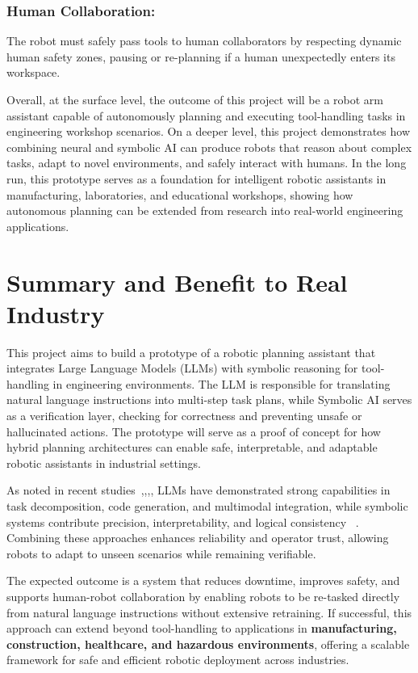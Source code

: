 \documentclass[12pt]{extarticle}
\begin{document}
\subsubsection{Human Collaboration:} The robot must safely pass tools to human collaborators by respecting dynamic human safety zones, pausing or re-planning if a human unexpectedly enters its workspace.

Overall, at the surface level, the outcome of this project will be a robot arm assistant capable of autonomously planning and executing tool-handling tasks in engineering workshop scenarios. On a deeper level, this project demonstrates how combining neural and symbolic AI can produce robots that reason about complex tasks, adapt to novel environments, and safely interact with humans. In the long run, this prototype serves as a foundation for intelligent robotic assistants in manufacturing, laboratories, and educational workshops, showing how autonomous planning can be extended from research into real-world engineering applications.

\newpage
\section{Summary and Benefit to Real Industry}

This project aims to build a prototype of a robotic planning assistant that integrates Large Language Models (LLMs) with symbolic reasoning for tool-handling in engineering environments. The LLM is responsible for translating natural language instructions into multi-step task plans, while Symbolic AI serves as a verification layer, checking for correctness and preventing unsafe or hallucinated actions. The prototype will serve as a proof of concept for how hybrid planning architectures can enable safe, interpretable, and adaptable robotic assistants in industrial settings.

As noted in recent studies~\cite{enhancing-interpret},\cite{learning-neuro-symbolic},\cite{code-as-symbolic-planner},\cite{code-as-policies}, LLMs have demonstrated strong capabilities in task decomposition, code generation, and multimodal integration, while symbolic systems contribute precision, interpretability, and logical consistency ~\cite{code-as-symbolic-planner}. Combining these approaches enhances reliability and operator trust, allowing robots to adapt to unseen scenarios while remaining verifiable.

The expected outcome is a system that reduces downtime, improves safety, and supports human-robot collaboration by enabling robots to be re-tasked directly from natural language instructions without extensive retraining. If successful, this approach can extend beyond tool-handling to applications in \textbf{manufacturing, construction, healthcare, and hazardous environments}, offering a scalable framework for safe and efficient robotic deployment across industries.
\end{document}
